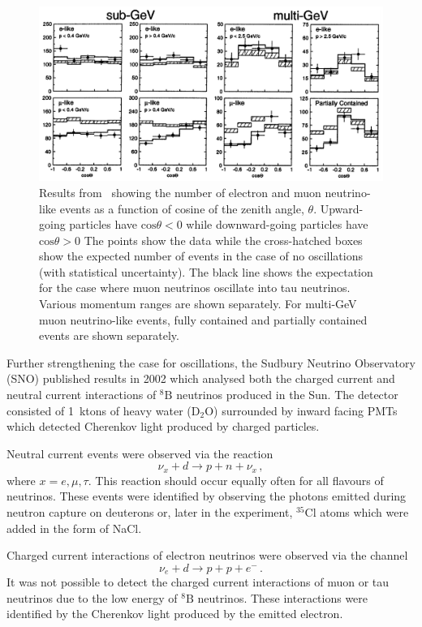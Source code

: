 \begin{figure}[h]
  \centering
  \includegraphics[width=\linewidth]{files/figures/theory/superKResults}
  \caption{Results from~\cite{superK} showing the number of electron and muon neutrino-like events as a function of cosine of the zenith angle, $\theta$. Upward-going particles have $\text{cos}\theta<0$ while downward-going particles have $\text{cos}\theta>0$ The points show the data while the cross-hatched boxes show the expected number of events in the case of no oscillations (with statistical uncertainty). The black line shows the expectation for the case where muon neutrinos oscillate into tau neutrinos. Various momentum ranges are shown separately. For multi-GeV muon neutrino-like events, fully contained and partially contained events are shown separately.}
  \label{fig:superKResults}
\end{figure}

Further strengthening the case for oscillations, the Sudbury Neutrino Observatory (SNO) published results in 2002 which analysed both the charged current and neutral current interactions of $^{8}\text{B}$ neutrinos produced in the Sun.
The detector consisted of 1~ktons of heavy water ($\text{D}_{2}\text{O}$) surrounded by inward facing PMTs which detected Cherenkov light produced by charged particles.

Neutral current events were observed via the reaction
\begin{equation}
  \nu_{x} + d \rightarrow p + n + \nu_{x} \, ,
\end{equation}
where $x = e, \mu, \tau$.
This reaction should occur equally often for all flavours of neutrinos.
These events were identified by observing the photons emitted during neutron capture on deuterons or, later in the experiment, $^{35}\text{Cl}$ atoms which were added in the form of NaCl.  

Charged current interactions of electron neutrinos were observed via the channel
\begin{equation}
  \nu_{e} + d \rightarrow p + p + e^{-} \, .
\end{equation}
It was not possible to detect the charged current interactions of muon or tau neutrinos due to the low energy of $^{8}\text{B}$ neutrinos.
These interactions were identified by the Cherenkov light produced by the emitted electron.

